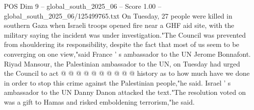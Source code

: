 \begin{textsample}{POS Dim 9 – global\_south\_2025\_06 – Score 1.00 – global\_south\_2025\_06/125499765.txt}
On Tuesday, 27 people were killed in southern Gaza when Israeli troops opened fire near a GHF aid site, with the military saying the incident was under investigation."The Council was prevented from shouldering its responsibility, despite the fact that most of us seem to be converging on one view,"said France ' s ambassador to the UN Jerome Bonnafont.
Riyad Mansour, the Palestinian ambassador to the UN, on Tuesday had urged the Council to act @ @ @ @ @ @ @ @ @ @ history as to how much have we done in order to stop this crime against the Palestinian people,"he said.
Israel ' s ambassador to the UN Danny Danon attacked the text."The resolution voted on was a gift to Hamas and risked emboldening terrorism,"he said.

\end{textsample}
